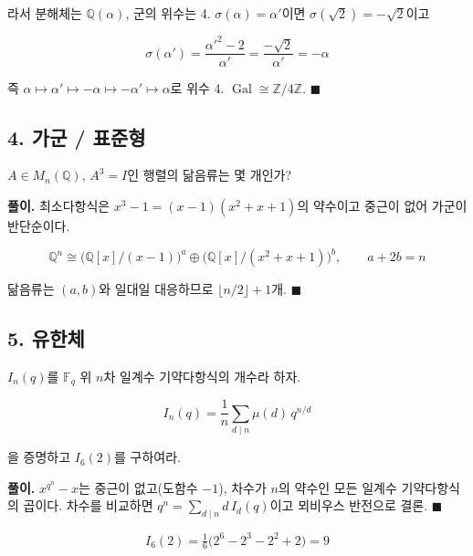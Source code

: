라서 분해체는 \(\mathbb Q(\alpha)\), 군의 위수는 4.
\(\sigma(\alpha)=\alpha'\)이면 \(\sigma(\sqrt2)=-\sqrt2\)이고

\[
\sigma(\alpha')=\frac{\alpha'^2-2}{\alpha'}=\frac{-\sqrt2}{\alpha'}=-\alpha
\]

즉 \(\alpha\mapsto\alpha'\mapsto-\alpha\mapsto-\alpha'\mapsto\alpha\)로
위수 4. \(\operatorname{Gal}\cong\mathbb Z/4\mathbb Z\).
\(\blacksquare\)

\subsection{4. 가군 / 표준형}

\(A\in M_n(\mathbb Q)\), \(A^3=I\)인 행렬의 닮음류는 몇 개인가?

\textbf{풀이.} 최소다항식은 \(x^3-1=(x-1)(x^2+x+1)\)의 약수이고 중근이
없어 가군이 반단순이다.

\[
\mathbb Q^n\cong\big(\mathbb Q[x]/(x-1)\big)^a\oplus\big(\mathbb Q[x]/(x^2+x+1)\big)^b,\qquad a+2b=n
\]

닮음류는 \((a,b)\)와 일대일 대응하므로 \(\lfloor n/2\rfloor+1\)개.
\(\blacksquare\)

\subsection{5. 유한체}

\(I_n(q)\)를 \(\mathbb F_q\) 위 \(n\)차 일계수 기약다항식의 개수라 하자.

\[
I_n(q)=\frac1n\sum_{d\mid n}\mu(d)\,q^{n/d}
\]

을 증명하고 \(I_6(2)\)를 구하여라.

\textbf{풀이.} \(x^{q^n}-x\)는 중근이 없고(도함수 \(-1\)), 차수가
\(n\)의 약수인 모든 일계수 기약다항식의 곱이다. 차수를 비교하면
\(q^n=\sum_{d\mid n}d\,I_d(q)\)이고 뫼비우스 반전으로 결론.
\(\blacksquare\)

\[
I_6(2)=\tfrac16\big(2^6-2^3-2^2+2\big)=9
\]
